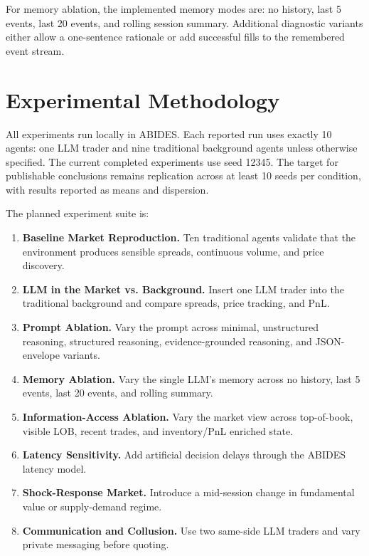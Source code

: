 \documentclass[11pt]{article}
\begin{document}
For memory ablation, the implemented memory modes are: no history, last 5 events, last 20 events, and rolling session summary. Additional diagnostic variants either allow a one-sentence rationale or add successful fills to the remembered event stream.

\section{Experimental Methodology}

All experiments run locally in ABIDES. Each reported run uses exactly 10 agents: one LLM trader and nine traditional background agents unless otherwise specified. The current completed experiments use seed 12345. The target for publishable conclusions remains replication across at least 10 seeds per condition, with results reported as means and dispersion.

The planned experiment suite is:

\begin{enumerate}
    \item \textbf{Baseline Market Reproduction.} Ten traditional agents validate that the environment produces sensible spreads, continuous volume, and price discovery.
    \item \textbf{LLM in the Market vs. Background.} Insert one LLM trader into the traditional background and compare spreads, price tracking, and PnL.
    \item \textbf{Prompt Ablation.} Vary the prompt across minimal, unstructured reasoning, structured reasoning, evidence-grounded reasoning, and JSON-envelope variants.
    \item \textbf{Memory Ablation.} Vary the single LLM's memory across no history, last 5 events, last 20 events, and rolling summary.
    \item \textbf{Information-Access Ablation.} Vary the market view across top-of-book, visible LOB, recent trades, and inventory/PnL enriched state.
    \item \textbf{Latency Sensitivity.} Add artificial decision delays through the ABIDES latency model.
    \item \textbf{Shock-Response Market.} Introduce a mid-session change in fundamental value or supply-demand regime.
    \item \textbf{Communication and Collusion.} Use two same-side LLM traders and vary private messaging before quoting.
\end{enumerate}
\end{document}
